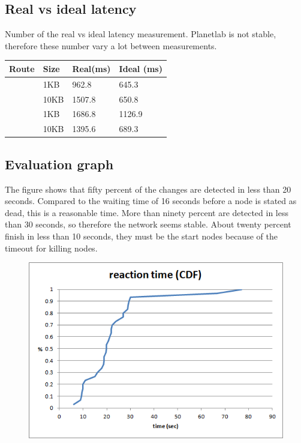 \documentclass[paper=a4, fontsize=11pt]{scrartcl} %
\numberwithin{equation}{section} %
\numberwithin{figure}{section} %
\numberwithin{table}{section} %
\begin{document}
\subsection{Real vs ideal latency}

Number of the real vs ideal latency measurement. Planetlab is not stable, therefore these number vary a lot between measurements.

\begin{center}
    \begin{tabular}{| l | l | l | l |}
    \hline
    Route & Size & Real(ms) & Ideal (ms) \\ \hline
    [2,9] & 1KB & 962.8 & 645.3 \\ \hline
    [2,9] & 10KB & 1507.8 & 650.8 \\ \hline
    [4,14] & 1KB & 1686.8 & 1126.9 \\ \hline
    [4,14] & 10KB & 1395.6 & 689.3 \\ \hline
    \hline
    \end{tabular}
\end{center}


\subsection{Evaluation graph}

The figure shows that fifty percent of the changes are detected in less than 20 seconds. Compared to the waiting time of 16 seconds before a node is stated as dead, this is a reasonable time. More than ninety percent are detected in less than 30 seconds, so therefore the network seems stable. About twenty percent finish in less than 10 seconds, they must be the start nodes because of the timeout for killing nodes.

\begin{figure}[h!]
\includegraphics[width=\columnwidth]{reaction_cdf.PNG}
\end{figure}
\end{document}
